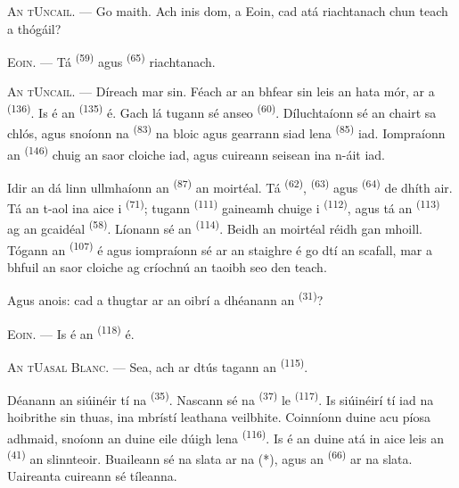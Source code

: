 \VUsaut{3.0mm}
\VUsaut{3.0mm}

\textsc{An tUncail}. --- Go maith. Ach inis dom, a Eoin, cad atá riachtanach chun
teach a thógáil?

\textsc{Eoin}. --- Tá  \textsuperscript{(59)} agus
 \textsuperscript{(65)} riachtanach.

\textsc{An tUncail}. --- Díreach mar sin. Féach ar an bhfear sin leis an hata mór,
ar a  \textsuperscript{(136)}. Is é an 
\textsuperscript{(135)} é. Gach lá tugann sé anseo 
\textsuperscript{(60)}. Díluchtaíonn sé an chairt sa chlós, agus snoíonn na
 \textsuperscript{(83)} na bloic agus gearrann siad lena
 \textsuperscript{(85)} iad. Iompraíonn an  \textsuperscript{(146)} chuig an saor cloiche iad, agus cuireann seisean
ina n-áit iad.

Idir an dá linn ullmhaíonn an  \textsuperscript{(87)} an
moirtéal. Tá  \textsuperscript{(62)}, 
\textsuperscript{(63)} agus  \textsuperscript{(64)} de dhíth air. Tá
an t-aol ina aice i  \textsuperscript{(71)}; tugann  \textsuperscript{(111)} gaineamh chuige i 
\textsuperscript{(112)}, agus tá an  \textsuperscript{(113)} ag
an gcaidéal \textsuperscript{(58)}. Líonann sé an 
\textsuperscript{(114)}. Beidh an moirtéal réidh gan mhoill. Tógann an
 \textsuperscript{(107)} é agus iompraíonn sé ar an staighre é
go dtí an scafall, mar a bhfuil an saor cloiche ag críochnú an taoibh seo den
teach.

Agus anois: cad a thugtar ar an oibrí a dhéanann an 
\textsuperscript{(31)}?

\textsc{Eoin}. --- Is é an  \textsuperscript{(118)} é.

\VUsaut{3.0mm}
\VUsaut{3.0mm}

\textsc{An tUasal Blanc}. --- Sea, ach ar dtús tagann an 
\textsuperscript{(115)}.

Déanann an siúinéir tí na  \textsuperscript{(35)}. Nascann sé na
 \textsuperscript{(37)} le  \textsuperscript{(117)}.
Is siúinéirí tí iad na hoibrithe sin thuas, ina mbrístí leathana veilbhite.
Coinníonn duine acu píosa adhmaid, snoíonn an duine eile dúigh lena
 \textsuperscript{(116)}. Is é an duine atá in aice leis an
 \textsuperscript{(41)} an slinnteoir. Buaileann sé na slata ar na
 (*), agus an  \textsuperscript{(66)} ar na slata.
Uaireanta cuireann sé tíleanna.

